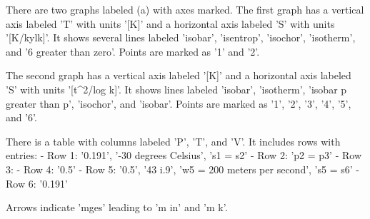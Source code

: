 There are two graphs labeled (a) with axes marked. The first graph has a vertical axis labeled 'T' with units '[K]' and a horizontal axis labeled 'S' with units '[K/kylk]'. It shows several lines labeled 'isobar', 'isentrop', 'isochor', 'isotherm', and '6 greater than zero'. Points are marked as '1' and '2'.

The second graph has a vertical axis labeled '[K]' and a horizontal axis labeled 'S' with units '[t^2/log k]'. It shows lines labeled 'isobar', 'isotherm', 'isobar p greater than p', 'isochor', and 'isobar'. Points are marked as '1', '2', '3', '4', '5', and '6'.

There is a table with columns labeled 'P', 'T', and 'V'. It includes rows with entries:
- Row 1: '0.191', '-30 degrees Celsius', 's1 = s2'
- Row 2: 'p2 = p3'
- Row 3: 
- Row 4: '0.5'
- Row 5: '0.5', '43 i.9', 'w5 = 200 meters per second', 's5 = s6'
- Row 6: '0.191'

Arrows indicate 'mges' leading to 'm in' and 'm k'.